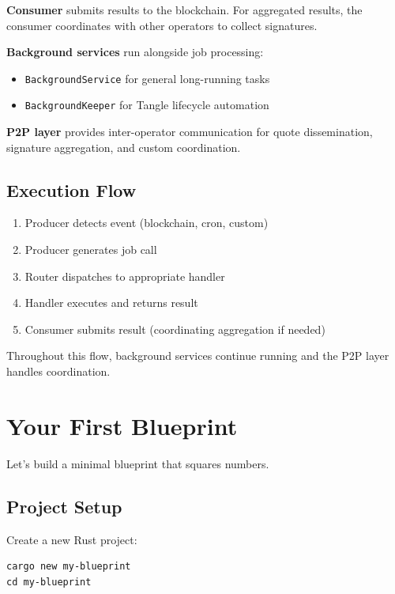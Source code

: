 \documentclass[11pt,a4paper]{article}
\begin{document}
\textbf{Consumer} submits results to the blockchain. For aggregated results, the consumer coordinates with other operators to collect signatures.

\textbf{Background services} run alongside job processing:
\begin{itemize}[noitemsep]
    \item \texttt{BackgroundService} for general long-running tasks
    \item \texttt{BackgroundKeeper} for Tangle lifecycle automation
\end{itemize}

\textbf{P2P layer} provides inter-operator communication for quote dissemination, signature aggregation, and custom coordination.

\subsection{Execution Flow}

\begin{enumerate}[noitemsep]
    \item Producer detects event (blockchain, cron, custom)
    \item Producer generates job call
    \item Router dispatches to appropriate handler
    \item Handler executes and returns result
    \item Consumer submits result (coordinating aggregation if needed)
\end{enumerate}

Throughout this flow, background services continue running and the P2P layer handles coordination.

\section{Your First Blueprint}

Let's build a minimal blueprint that squares numbers.

\subsection{Project Setup}

Create a new Rust project:
\begin{lstlisting}
cargo new my-blueprint
cd my-blueprint
\end{lstlisting}
\end{document}
